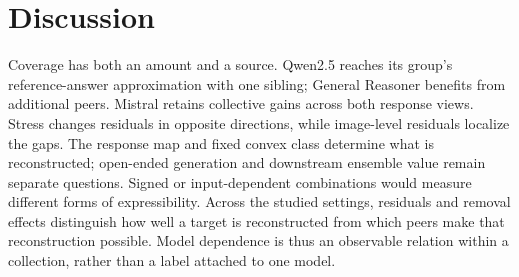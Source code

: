 \section{Discussion}
\label{sec:discussion}

Coverage has both an amount and a source. Qwen2.5 reaches its group's reference-answer approximation with one sibling; General Reasoner benefits from additional peers. Mistral retains collective gains across both response views. Stress changes residuals in opposite directions, while image-level residuals localize the gaps. The response map and fixed convex class determine what is reconstructed; open-ended generation and downstream ensemble value remain separate questions. Signed or input-dependent combinations would measure different forms of expressibility. Across the studied settings, residuals and removal effects distinguish how well a target is reconstructed from which peers make that reconstruction possible. Model dependence is thus an observable relation within a collection, rather than a label attached to one model.
